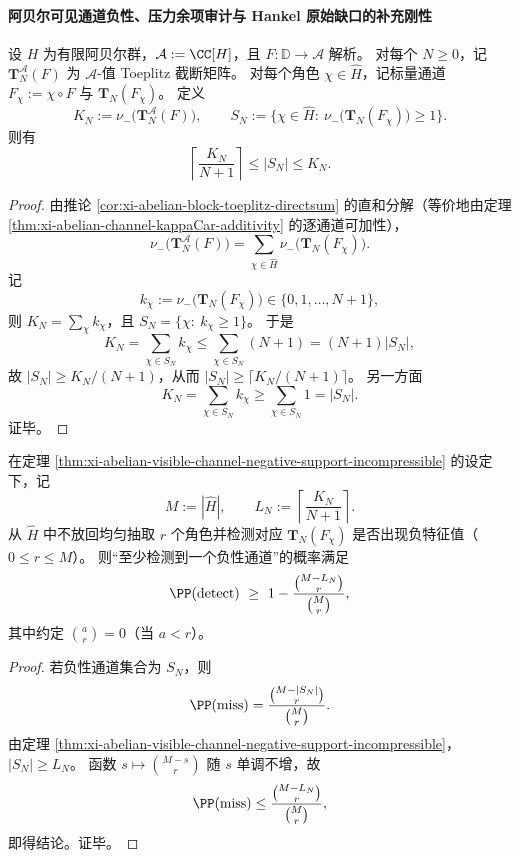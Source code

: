 \paragraph{阿贝尔可见通道负性、压力余项审计与 Hankel 原始缺口的补充刚性}

\begin{theorem}[有限阿贝尔可见通道上的负性支持不可压缩界]\label{thm:xi-abelian-visible-channel-negative-support-incompressible}
设 \(H\) 为有限阿贝尔群，\(\mathcal A:=\CC[H]\)，且 \(F:\mathbb D\to\mathcal A\) 解析。
对每个 \(N\ge 0\)，记 \(\mathbf T_N^{\mathcal A}(F)\) 为 \(\mathcal A\)-值 Toeplitz 截断矩阵。
对每个角色 \(\chi\in\widehat H\)，记标量通道 \(F_\chi:=\chi\circ F\) 与 \(\mathbf T_N(F_\chi)\)。
定义
\[
K_N:=\nu_-\!\bigl(\mathbf T_N^{\mathcal A}(F)\bigr),\qquad
S_N:=\{\chi\in\widehat H:\ \nu_-\!\bigl(\mathbf T_N(F_\chi)\bigr)\ge 1\}.
\]
则有
\[
\left\lceil \frac{K_N}{N+1}\right\rceil\le |S_N|\le K_N.
\]
\end{theorem}
\begin{proof}
由推论 \ref{cor:xi-abelian-block-toeplitz-directsum} 的直和分解（等价地由定理 \ref{thm:xi-abelian-channel-kappaCar-additivity} 的逐通道可加性），
\[
\nu_-\!\bigl(\mathbf T_N^{\mathcal A}(F)\bigr)
=\sum_{\chi\in\widehat H}\nu_-\!\bigl(\mathbf T_N(F_\chi)\bigr).
\]
记
\[
k_\chi:=\nu_-\!\bigl(\mathbf T_N(F_\chi)\bigr)\in\{0,1,\dots,N+1\},
\]
则 \(K_N=\sum_{\chi}k_\chi\)，且 \(S_N=\{\chi:\ k_\chi\ge 1\}\)。
于是
\[
K_N=\sum_{\chi\in S_N}k_\chi\le\sum_{\chi\in S_N}(N+1)=(N+1)|S_N|,
\]
故 \(|S_N|\ge K_N/(N+1)\)，从而 \(|S_N|\ge\lceil K_N/(N+1)\rceil\)。
另一方面
\[
K_N=\sum_{\chi\in S_N}k_\chi\ge \sum_{\chi\in S_N}1=|S_N|.
\]
证毕。
\end{proof}

\begin{corollary}[随机抽样通道的负性检测概率下界]\label{cor:xi-abelian-random-channel-negative-detection-lower-bound}
在定理 \ref{thm:xi-abelian-visible-channel-negative-support-incompressible} 的设定下，记
\[
M:=|\widehat H|,\qquad
L_N:=\left\lceil\frac{K_N}{N+1}\right\rceil.
\]
从 \(\widehat H\) 中不放回均匀抽取 \(r\) 个角色并检测对应 \(\mathbf T_N(F_\chi)\) 是否出现负特征值（\(0\le r\le M\)）。
则“至少检测到一个负性通道”的概率满足
\[
\PP(\mathrm{detect})\ \ge\
1-\frac{\binom{M-L_N}{r}}{\binom{M}{r}},
\]
其中约定 \(\binom{a}{r}=0\)（当 \(a<r\)）。
\end{corollary}
\begin{proof}
若负性通道集合为 \(S_N\)，则
\[
\PP(\mathrm{miss})
=\frac{\binom{M-|S_N|}{r}}{\binom{M}{r}}.
\]
由定理 \ref{thm:xi-abelian-visible-channel-negative-support-incompressible}，
\(
|S_N|\ge L_N
\)。
函数 \(s\mapsto \binom{M-s}{r}\) 随 \(s\) 单调不增，故
\[
\PP(\mathrm{miss})
\le \frac{\binom{M-L_N}{r}}{\binom{M}{r}},
\]
即得结论。证毕。
\end{proof}

